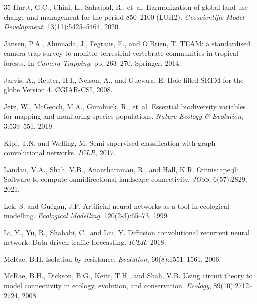 \begin{thebibliography}{35}
Hurtt, G.C., Chini, L., Sahajpal, R., et~al.
\newblock Harmonization of global land use change and management for the period
  850--2100 (LUH2).
\newblock \emph{Geoscientific Model Development}, 13(11):5425--5464, 2020.

Jansen, P.A., Ahumada, J., Fegraus, E., and O'Brien, T.
\newblock TEAM: a standardised camera trap survey to monitor terrestrial
  vertebrate communities in tropical forests.
\newblock In \emph{Camera Trapping}, pp. 263--270. Springer, 2014.

Jarvis, A., Reuter, H.I., Nelson, A., and Guevara, E.
\newblock Hole-filled SRTM for the globe Version 4.
\newblock CGIAR-CSI, 2008.

Jetz, W., McGeoch, M.A., Guralnick, R., et~al.
\newblock Essential biodiversity variables for mapping and monitoring species
  populations.
\newblock \emph{Nature Ecology \& Evolution}, 3:539--551, 2019.

Kipf, T.N. and Welling, M.
\newblock Semi-supervised classification with graph convolutional networks.
\newblock \emph{ICLR}, 2017.

Landau, V.A., Shah, V.B., Anantharaman, R., and Hall, K.R.
\newblock Omniscape.jl: Software to compute omnidirectional landscape
  connectivity.
\newblock \emph{JOSS}, 6(57):2829, 2021.

Lek, S. and Gu{\'e}gan, J.F.
\newblock Artificial neural networks as a tool in ecological modelling.
\newblock \emph{Ecological Modelling}, 120(2-3):65--73, 1999.

Li, Y., Yu, R., Shahabi, C., and Liu, Y.
\newblock Diffusion convolutional recurrent neural network: Data-driven traffic
  forecasting.
\newblock \emph{ICLR}, 2018.

McRae, B.H.
\newblock Isolation by resistance.
\newblock \emph{Evolution}, 60(8):1551--1561, 2006.

McRae, B.H., Dickson, B.G., Keitt, T.H., and Shah, V.B.
\newblock Using circuit theory to model connectivity in ecology, evolution, and
  conservation.
\newblock \emph{Ecology}, 89(10):2712--2724, 2008.


\end{thebibliography}
